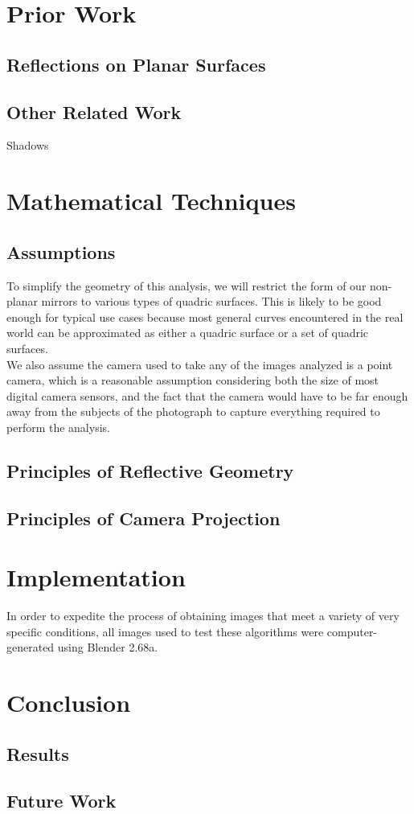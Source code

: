 \documentclass{article}
\begin{document}

\pagestyle{plain}





\section{Prior Work}
\subsection{Reflections on Planar Surfaces}
\subsection{Other Related Work}
Shadows

\section{Mathematical Techniques}
\subsection{Assumptions}
To simplify the geometry of this analysis, we will restrict the form of our non-planar mirrors to various types of quadric surfaces. This is likely to be good enough for typical use cases because most general curves encountered in the real world can be approximated as either a quadric surface or a set of quadric surfaces. \\
We also assume the camera used to take any of the images analyzed is a point camera, which is a reasonable assumption considering both the size of most digital camera sensors, and the fact that the camera would have to be far enough away from the subjects of the photograph to capture everything required to perform the analysis.

\subsection{Principles of Reflective Geometry}

\subsection{Principles of Camera Projection}

\section{Implementation}
In order to expedite the process of obtaining images that meet a variety of very specific conditions, all images used to test these algorithms were computer-generated using Blender 2.68a.


\section{Conclusion}
\subsection{Results}
\subsection{Future Work}



\appendix
%
%
\end{document}
